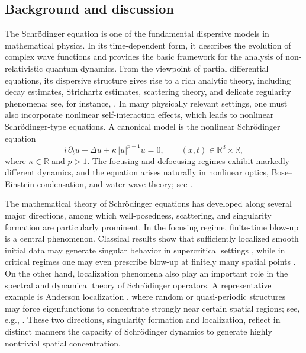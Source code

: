 \documentclass[11pt,reqno,oneside]{amsart}
\numberwithin{equation}{section}
\theoremstyle{definition}
\theoremstyle{remark}
\numberwithin{equation}{section}
\begin{document}
\subsection{Background and discussion}

The Schr\"odinger equation is one of the fundamental dispersive models in mathematical physics. In its time-dependent form, it describes the evolution of complex wave functions and provides the basic framework for the analysis of non-relativistic quantum dynamics. From the viewpoint of partial differential equations, its dispersive structure gives rise to a rich analytic theory, including decay estimates, Strichartz estimates, scattering theory, and delicate regularity phenomena; see, for instance, \cite{Cazenave2003Semilinear, Tao2006NDE}. In many physically relevant settings, one must also incorporate nonlinear self-interaction effects, which leads to nonlinear Schr\"odinger-type equations. A canonical model is the nonlinear Schr\"odinger equation
\begin{equation}\label{eq:NLS}
	i\,\partial_{t} u + \Delta u + \kappa\,|u|^{p-1} u = 0,
	\qquad (x,t) \in \mathbb{R}^{d} \times \mathbb{R},
\end{equation}
where $\kappa \in \mathbb{R}$ and $p > 1$. The focusing and defocusing regimes exhibit markedly different dynamics, and the equation arises naturally in nonlinear optics, Bose--Einstein condensation, and water wave theory; see \cite{SulemSulemNLS, Cazenave2003Semilinear, Tao2006NDE}.

The mathematical theory of Schr\"odinger equations has developed along several major directions, among which well-posedness, scattering, and singularity formation are particularly prominent. In the focusing regime, finite-time blow-up is a central phenomenon. Classical results show that sufficiently localized smooth initial data may generate singular behavior in supercritical settings \cite{Glassey1977Blowup}, while in critical regimes one may even prescribe blow-up at finitely many spatial points \cite{Merle1990kBlowup, Fan2017LogLogMultiPoint}. On the other hand, localization phenomena also play an important role in the spectral and dynamical theory of Schr\"odinger operators. A representative example is Anderson localization \cite{Anderson1958}, where random or quasi-periodic structures may force eigenfunctions to concentrate strongly near certain spatial regions; see, e.g., \cite{Cycon1987, ReedSimon3, Taylor1972, Yafaev1992}. These two directions, singularity formation and localization, reflect in distinct manners the capacity of Schr\"odinger dynamics to generate highly nontrivial spatial concentration.
\end{document}
